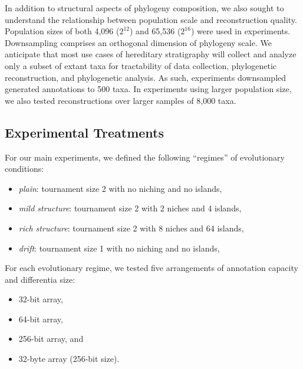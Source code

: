 In addition to structural aspects of phylogeny composition, we also sought to understand the relationship between population scale and reconstruction quality.
Population sizes of both 4,096 ($2^{12}$) and 65,536 ($2^{16}$) were used in experiments.
Downsampling comprises an orthogonal dimension of phylogeny scale.
We anticipate that most use cases of hereditary stratigraphy will collect and analyze only a subset of extant taxa for tractability of data collection, phylogenetic reconstruction, and phylogenetic analysis.
As such, experiments downsampled generated annotations to 500 taxa.
In experiments using larger population size, we also tested reconstructions over larger samples of 8,000 taxa.

\subsection{Experimental Treatments}

For our main experiments, we defined the following ``regimes'' of evolutionary conditions:
\begin{itemize}
  \item \textit{plain}: tournament size 2 with no niching and no islands,
  \item \textit{mild structure}: tournament size 2 with 2 niches and 4 islands,
  \item \textit{rich structure}: tournament size 2 with 8 niches and 64 islands,
  \item \textit{drift}: tournament size 1 with no niching and no islands,
\end{itemize}



For each evolutionary regime, we tested five arrangements of annotation capacity and differentia size:
\begin{itemize}
  \item 32-bit array,
  \item 64-bit array,
  \item 256-bit array, and
  \item 32-byte array (256-bit size).
\end{itemize}

